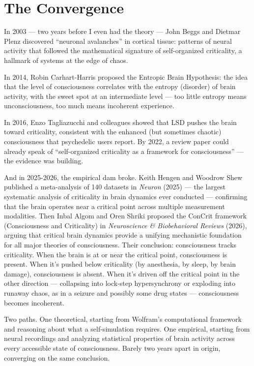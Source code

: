 \documentclass[11pt, twoside, openright]{book}
\begin{document}
\section*{The Convergence}

In 2003 --- two years before I even had the theory --- John Beggs and Dietmar Plenz discovered ``neuronal avalanches'' in cortical tissue: patterns of neural activity that followed the mathematical signature of self-organized criticality, a hallmark of systems at the edge of chaos.

In 2014, Robin Carhart-Harris proposed the Entropic Brain Hypothesis: the idea that the level of consciousness correlates with the entropy (disorder) of brain activity, with the sweet spot at an intermediate level --- too little entropy means unconsciousness, too much means incoherent experience.

In 2016, Enzo Tagliazucchi and colleagues showed that LSD pushes the brain toward criticality, consistent with the enhanced (but sometimes chaotic) consciousness that psychedelic users report. By 2022, a review paper could already speak of ``self-organized criticality as a framework for consciousness'' --- the evidence was building.

And in 2025-2026, the empirical dam broke. Keith Hengen and Woodrow Shew published a meta-analysis of 140 datasets in \textit{Neuron} (2025) --- the largest systematic analysis of criticality in brain dynamics ever conducted --- confirming that the brain operates near a critical point across multiple measurement modalities. Then Inbal Algom and Oren Shriki proposed the ConCrit framework (Consciousness and Criticality) in \textit{Neuroscience \& Biobehavioral Reviews} (2026), arguing that critical brain dynamics provide a unifying mechanistic foundation for all major theories of consciousness. Their conclusion: consciousness tracks criticality. When the brain is at or near the critical point, consciousness is present. When it's pushed below criticality (by anesthesia, by sleep, by brain damage), consciousness is absent. When it's driven off the critical point in the other direction --- collapsing into lock-step hypersynchrony or exploding into runaway chaos, as in a seizure and possibly some drug states --- consciousness becomes incoherent.

Two paths. One theoretical, starting from Wolfram's computational framework and reasoning about what a self-simulation requires. One empirical, starting from neural recordings and analyzing statistical properties of brain activity across every accessible state of consciousness. Barely two years apart in origin, converging on the same conclusion.
\end{document}
